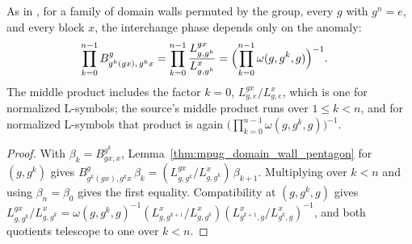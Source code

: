\begin{lemma}
    \label{thm:mpug_domain_wall_interchange}
    \leanok
    As in \cite[Section~IV.C]{GarreRubioSchuch2024DomainWall}, for a family
    of domain walls permuted by the group, every $g$ with $g^n=e$, and every
    block $x$, the interchange phase depends only on the anomaly:
    \begin{align}
        \prod_{k=0}^{n-1}B^g_{g^k(gx),\,g^kx}
         & =\prod_{k=0}^{n-1}\frac{L^{gx}_{g,g^k}}{L^x_{g,g^k}}
        =\Bigl(\prod_{k=0}^{n-1}\omega(g,g^k,g)\Bigr)^{-1}.
        \notag
    \end{align}
    The middle product includes the factor $k=0$, $L^{gx}_{g,e}/L^x_{g,e}$,
    which is one for normalized L-symbols; the source's middle product runs
    over $1\leq k<n$, and for normalized L-symbols that product is again
    $\bigl(\prod_{k=0}^{n-1}\omega(g,g^k,g)\bigr)^{-1}$.
\end{lemma}

\begin{proof}\leanok
    With $\beta_k=B^{g^k}_{gx,x}$,
    Lemma~\ref{thm:mpug_domain_wall_pentagon} for $(g,g^k)$ gives
    $B^g_{g^k(gx),g^kx}\,\beta_k=(L^{gx}_{g,g^k}/L^x_{g,g^k})\,\beta_{k+1}$.
    Multiplying over $k<n$ and using $\beta_n=\beta_0$ gives the first
    equality. Compatibility at $(g,g^k,g)$ gives
    $L^{gx}_{g,g^k}/L^x_{g,g^k}=\omega(g,g^k,g)^{-1}
        (L^x_{g,g^{k+1}}/L^x_{g,g^k})(L^x_{g^{k+1},g}/L^x_{g^k,g})^{-1}$,
    and both quotients telescope to one over $k<n$.
\end{proof}

